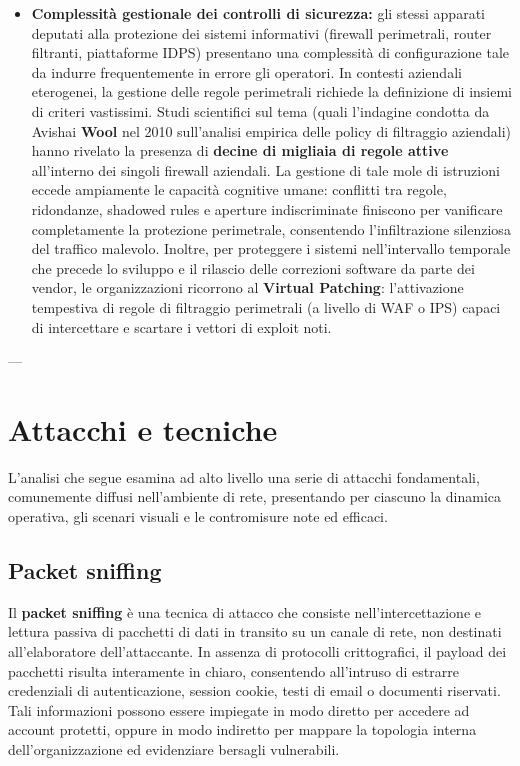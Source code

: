 \documentclass[../../main.tex]{subfiles}
\begin{document}
\begin{itemize}
    \item \textbf{Complessità gestionale dei controlli di sicurezza:} gli stessi apparati deputati alla protezione dei sistemi informativi (firewall perimetrali, router filtranti, piattaforme IDPS) presentano una complessità di configurazione tale da indurre frequentemente in errore gli operatori. In contesti aziendali eterogenei, la gestione delle regole perimetrali richiede la definizione di insiemi di criteri vastissimi. Studi scientifici sul tema (quali l'indagine condotta da Avishai \textbf{Wool} nel 2010 sull'analisi empirica delle policy di filtraggio aziendali) hanno rivelato la presenza di \textbf{decine di migliaia di regole attive} all'interno dei singoli firewall aziendali. La gestione di tale mole di istruzioni eccede ampiamente le capacità cognitive umane: conflitti tra regole, ridondanze, shadowed rules e aperture indiscriminate finiscono per vanificare completamente la protezione perimetrale, consentendo l'infiltrazione silenziosa del traffico malevolo. Inoltre, per proteggere i sistemi nell'intervallo temporale che precede lo sviluppo e il rilascio delle correzioni software da parte dei vendor, le organizzazioni ricorrono al \textbf{Virtual Patching}: l'attivazione tempestiva di regole di filtraggio perimetrali (a livello di WAF o IPS) capaci di intercettare e scartare i vettori di exploit noti.
\end{itemize}

---

\section{Attacchi e tecniche}
\label{sec:attacchi_e_tecniche}

L'analisi che segue esamina ad alto livello una serie di attacchi fondamentali, comunemente diffusi nell'ambiente di rete, presentando per ciascuno la dinamica operativa, gli scenari visuali e le contromisure note ed efficaci.

\subsection{Packet sniffing}
\label{subsec:packet_sniffing}

Il \textbf{packet sniffing} è una tecnica di attacco che consiste nell'intercettazione e lettura passiva di pacchetti di dati in transito su un canale di rete, non destinati all'elaboratore dell'attaccante. In assenza di protocolli crittografici, il payload dei pacchetti risulta interamente in chiaro, consentendo all'intruso di estrarre credenziali di autenticazione, session cookie, testi di email o documenti riservati. Tali informazioni possono essere impiegate in modo diretto per accedere ad account protetti, oppure in modo indiretto per mappare la topologia interna dell'organizzazione ed evidenziare bersagli vulnerabili.
\end{document}
